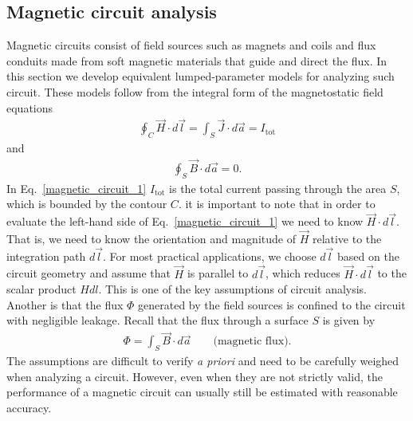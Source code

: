 \documentclass[12pt,a4paper,oneside]{book}
\begin{document}
\begin{onehalfspace}
\section{Magnetic circuit analysis}
Magnetic circuits consist of field sources such as magnets and coils and flux conduits made from soft magnetic materials that guide and direct the flux. In this section we develop equivalent lumped-parameter models for analyzing such circuit. These models follow from the integral form of the magnetostatic field equations
\begin{equation}\label{magnetic_circuit_1}
	{\begin{aligned}
			\oint_{C} \vec{H}\cdot d\vec{l} = \int_{S}\vec{J}\cdot d\vec{a} = I_\text{tot}
	\end{aligned}}
\end{equation} 
and
\begin{equation}\label{magnetic_circuit_2}
	{\begin{aligned}
			\oint_{S} \vec{B}\cdot d\vec{a} = 0.
	\end{aligned}}
\end{equation} 
In Eq.~\eqref{magnetic_circuit_1} $I_\text{tot}$ is the total current passing through the area $S$, which is bounded by the contour $C$. it is important to note that in order to evaluate the left-hand side of Eq.~\eqref{magnetic_circuit_1} we need to know $\vec{H}\cdot d\vec{l}$.  That is, we need to know the orientation and magnitude of $\vec{H}$ relative to the integration path $d\vec{l}$. For most practical applications, we choose $d\vec{l}$ based on the circuit geometry and assume that $\vec{H}$ is parallel to $d\vec{l}$, which reduces $\vec{H}\cdot d\vec{l}$ to the scalar product $Hdl$. This is one of the key assumptions of circuit analysis. Another is that the flux $\Phi$ generated by the field sources is confined to the circuit with negligible leakage. Recall that the flux through a surface $S$ is given by
 \begin{equation}\label{magnetic_circuit_3}
 	{\begin{aligned}
 			\Phi = \int_{S} \vec{B}\cdot d\vec{a} \qquad\text{(magnetic flux).}
 	\end{aligned}}
 \end{equation} 
The assumptions are difficult to verify \textit{a priori} and need to be carefully weighed when analyzing a circuit. However, even when they are not strictly valid, the performance of a magnetic circuit can usually still be estimated with reasonable accuracy.


\end{onehalfspace}
\end{document}
